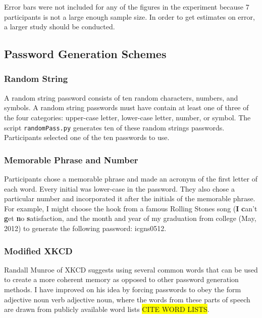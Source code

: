 \documentclass{article}
\newcommand{\hl}[1]
{\colorbox{yellow}{#1}}
\begin{document}
Error bars were not included for any of the figures in the experiment because 7 participants is not a large enough sample size. In order to get estimates on error, a larger study should be conducted.



\subsection*{Password Generation Schemes}
\subsubsection*{Random String}
A random string password consists of ten random characters, numbers, and symbols. A random string passwords must have contain at least one of three of the four categories: upper-case letter, lower-case letter, number, or symbol. The script \texttt{randomPass.py} generates ten of these random strings passwords. Participants selected one of the ten passwords to use.


\subsubsection*{Memorable Phrase and Number}
Participants chose a memorable phrase and made an acronym of the first letter of each word. Every initial was lower-case in the password. They also chose a particular number and incorporated it after the initials of the memorable phrase. For example, I might choose the hook from a famous Rolling Stones song (\textbf{I} \textbf{c}an't \textbf{g}et \textbf{n}o \textbf{s}atisfaction, and the month and year of my graduation from college (May, 2012) to generate the following password: icgns0512. 

\subsubsection*{Modified XKCD}
Randall Munroe of XKCD suggests using several common words that can be used to create a more coherent memory as opposed to other password generation methods. I have improved on his idea by forcing passwords to obey the form adjective noun verb adjective noun, where the words from these parts of speech are drawn from publicly available word lists \hl{CITE WORD LISTS}.
\end{document}
